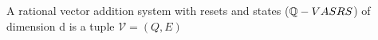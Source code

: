 
\begin{mydef}
A rational vector addition system with resets and states ($\mathbb{Q}-VASRS$) of dimension d is a tuple $\mathcal{V} = (Q, E)$
\end{mydef}

